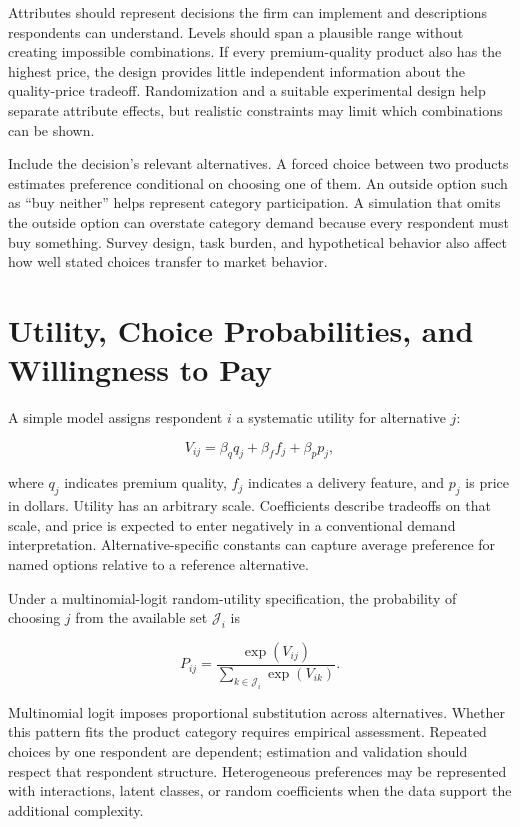 Attributes should represent decisions the firm can implement and
descriptions respondents can understand. Levels should span a plausible
range without creating impossible combinations. If every premium-quality
product also has the highest price, the design provides little
independent information about the quality-price tradeoff. Randomization
and a suitable experimental design help separate attribute effects, but
realistic constraints may limit which combinations can be shown.

Include the decision's relevant alternatives. A forced choice between
two products estimates preference conditional on choosing one of them.
An outside option such as ``buy neither'' helps represent category
participation. A simulation that omits the outside option can overstate
category demand because every respondent must buy something. Survey
design, task burden, and hypothetical behavior also affect how well
stated choices transfer to market behavior.

\hypertarget{M04-utility-choice-probabilities-and-willingness-to-pay}{%
\section{Utility, Choice Probabilities, and Willingness to
Pay}\label{M04-utility-choice-probabilities-and-willingness-to-pay}}

\noindent A simple model assigns respondent \(i\) a systematic utility for
alternative \(j\):

\[
V_{ij}=\beta_q q_j+\beta_f f_j+\beta_p p_j,
\]

where \(q_j\) indicates premium quality, \(f_j\) indicates a delivery
feature, and \(p_j\) is price in dollars. Utility has an arbitrary
scale. Coefficients describe tradeoffs on that scale, and price is
expected to enter negatively in a conventional demand interpretation.
Alternative-specific constants can capture average preference for named
options relative to a reference alternative.

Under a multinomial-logit random-utility specification, the probability
of choosing \(j\) from the available set \(\mathcal J_i\) is

\[
P_{ij}=\frac{\exp(V_{ij})}{\sum_{k\in\mathcal J_i}\exp(V_{ik})}.
\]

Multinomial logit imposes proportional substitution across alternatives.
Whether this pattern fits the product category requires empirical
assessment. Repeated choices by one respondent are dependent; estimation
and validation should respect that respondent structure. Heterogeneous
preferences may be represented with interactions, latent classes, or
random coefficients when the data support the additional complexity.

